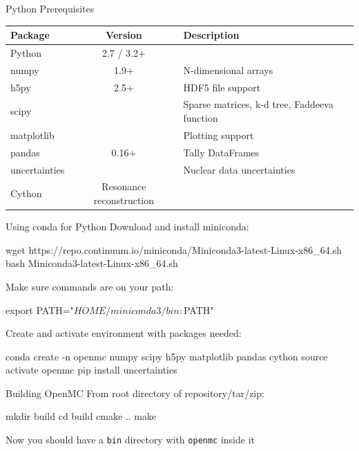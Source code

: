 \documentclass[noamssymb,svgnames]{beamer}
\begin{document}
\begin{frame}{Python Prerequisites}
  \begin{table}
    \centering
    \small{
    \begin{tabular}{lcl}
      \toprule
      \textbf{Package} & \textbf{Version} & \textbf{Description} \\
      \midrule
      Python & 2.7 / 3.2+ &  \\
      numpy & 1.9+ & N-dimensional arrays \\
      h5py & 2.5+ & HDF5 file support \\
      scipy &  & Sparse matrices, k-d tree, Faddeeva function \\
      matplotlib &  & Plotting support \\
      pandas & 0.16+ & Tally DataFrames \\
      uncertainties &  & Nuclear data uncertainties \\
      Cython & Resonance reconstruction \\
      \bottomrule
    \end{tabular}
    }
  \end{table}
\end{frame}

\begin{frame}[fragile]{Using conda for Python}
  Download and install miniconda:
  \begin{shell}[minted options={fontsize=\tiny}]
    wget https://repo.continuum.io/miniconda/Miniconda3-latest-Linux-x86_64.sh
    bash Miniconda3-latest-Linux-x86_64.sh
  \end{shell}
  \vfill
  Make sure commands are on your path:
  \begin{shell}
    export PATH="$HOME/miniconda3/bin:$PATH"
  \end{shell}
  \vfill
  Create and activate environment with packages needed:
  \begin{shell}[minted options={fontsize=\tiny}]
    conda create -n openmc numpy scipy h5py matplotlib pandas cython
    source activate openmc
    pip install uncertainties
  \end{shell}
\end{frame}

\begin{frame}[fragile]{Building OpenMC}
  From root directory of repository/tar/zip:
  \begin{shell}
    mkdir build
    cd build
    cmake ..
    make
  \end{shell}
  Now you should have a \texttt{bin} directory with
  \textcolor{green!60!black}{\texttt{openmc}} inside it
\end{frame}
\end{document}
